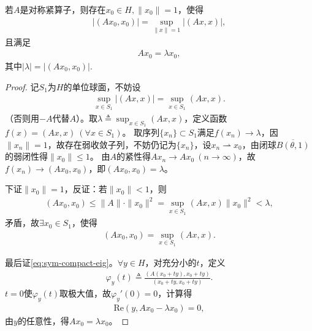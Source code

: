 \documentclass[../../main.tex]{subfiles}%
\begin{document}
\begin{theorem}\label{theorem:对称算子的算子范数等于某个元的内积}
若$A$是对称紧算子，则存在$x_0\in H,\|x_0\|=1$，使得
\begin{align*}
|(Ax_0,x_0)|=\sup_{\|x\|=1}|(Ax,x)|,
\end{align*}
且满足
\begin{align}
Ax_0=\lambda x_0,\label{eq:sym-compact-eig}
\end{align}
其中$|\lambda|=|(Ax_0,x_0)|$.
\end{theorem}
\begin{proof}
记$S_1$为$H$的单位球面，不妨设
\begin{align}
\sup_{x\in S_1}|(Ax,x)|=\sup_{x\in S_1}(Ax,x).\label{eq:sym-compact-sup}
\end{align}
（否则用$-A$代替$A$）。取$\displaystyle\lambda\triangleq\sup_{x\in S_1}(Ax,x)$，定义函数$f(x)=(Ax,x)\ (\forall x\in S_1)$。
取序列$\{x_n\}\subset S_1$满足$f(x_n)\to\lambda$，因$\|x_n\|=1$，故存在弱收敛子列，不妨仍记为$\{x_n\}$，设$x_n\rightharpoonup x_0$，由闭球$\overline{B(\theta,1)}$的弱闭性得$\|x_0\|\leqslant1$。
由$A$的紧性得$Ax_n\to Ax_0\ (n\to\infty)$，故$f(x_n)\to(Ax_0,x_0)$，即$(Ax_0,x_0)=\lambda$。

下证$\|x_0\|=1$，反证：若$\|x_0\|<1$，则
\begin{align*}
(Ax_0,x_0)\leqslant\|A\|\cdot\|x_0\|^2=\sup_{x\in S_1}(Ax,x)\|x_0\|^2<\lambda,
\end{align*}
矛盾，故$\exists x_0\in S_1$，使得
\begin{align*}
(Ax_0,x_0)=\sup_{x\in S_1}(Ax,x).
\end{align*}

最后证\eqref{eq:sym-compact-eig}。$\forall y\in H$，对充分小的$t$，定义
\begin{align*}
\varphi_y(t)\triangleq\frac{(A(x_0+ty),x_0+ty)}{(x_0+ty,x_0+ty)}.
\end{align*}
$t=0$使$\varphi_y(t)$取极大值，故$\varphi_y'(0)=0$，计算得
\begin{align*}
\mathrm{Re}(y,Ax_0-\lambda x_0)=0,
\end{align*}
由$y$的任意性，得$Ax_0=\lambda x_0$。
\end{proof}
\end{document}
